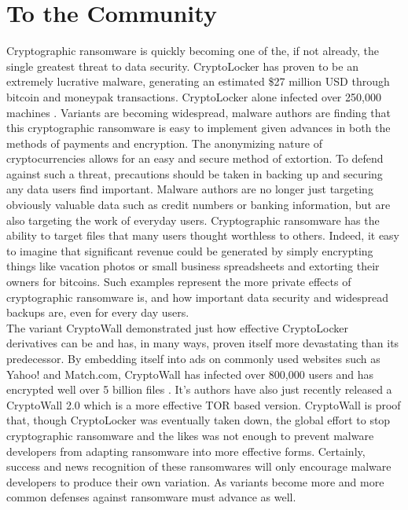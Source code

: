 \documentclass[11.5pt]{article}
\begin{document}
\section{To the Community}
	Cryptographic ransomware is quickly becoming one of the, if not already, the single greatest threat to data security.  CryptoLocker has proven to be an extremely lucrative malware, generating an estimated \$27 million USD through bitcoin and moneypak transactions.  CryptoLocker alone infected over 250,000 machines \cite{zdnet}.  Variants are becoming widespread,   malware authors are finding that this cryptographic ransomware is easy to implement given advances in both the methods of payments and encryption.  The anonymizing nature of cryptocurrencies allows for an easy and secure method of extortion.  To defend against such a threat,  precautions should be taken in backing up and securing any data users find important.  Malware authors are no longer just targeting obviously valuable data such as credit numbers or banking information, but are also targeting the work of everyday users.  Cryptographic ransomware has the ability to target files that many users thought worthless to others.  Indeed, it easy to imagine that significant revenue could be generated by simply encrypting things like vacation photos or small business spreadsheets and extorting their owners for bitcoins.  Such examples represent the more private effects of cryptographic ransomware is, and how important data security and widespread backups are, even for every day users.\\

	The variant CryptoWall demonstrated just how effective CryptoLocker derivatives can be and has, in many ways, proven itself more devastating than its predecessor. By embedding itself into ads on commonly used websites such as Yahoo! and Match.com, CryptoWall has infected over 800,000 users and has encrypted well over 5 billion files \cite{zdnet}.  It's authors have also just recently released a CryptoWall 2.0 which is a more effective TOR based version.  CryptoWall is proof that, though CryptoLocker was eventually taken down, the global effort to stop cryptographic ransomware and the likes was not enough to prevent malware developers from adapting ransomware into more effective forms.  Certainly, success and news recognition of these ransomwares will only encourage malware developers to produce their own variation.  As variants become more and more common defenses against ransomware must advance as well.    
\end{document}
